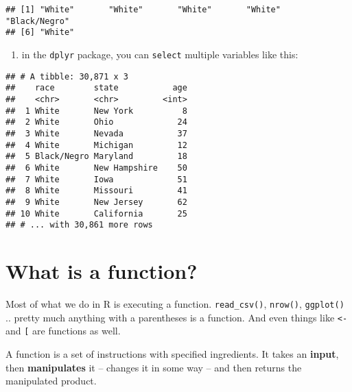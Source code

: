 \documentclass[]{book}
\newenvironment{Shaded}{\begin{snugshade}}{\end{snugshade}}
\newcommand{\KeywordTok}[1]{\textcolor[rgb]{0.13,0.29,0.53}{\textbf{#1}}}
\newcommand{\StringTok}[1]{\textcolor[rgb]{0.31,0.60,0.02}{#1}}
\newcommand{\OperatorTok}[1]{\textcolor[rgb]{0.81,0.36,0.00}{\textbf{#1}}}
\newcommand{\NormalTok}[1]{#1}
\providecommand{\tightlist}{%
  \setlength{\itemsep}{0pt}\setlength{\parskip}{0pt}}
\theoremstyle{definition}
\theoremstyle{definition}
\theoremstyle{definition}
\theoremstyle{remark}
\begin{document}
\begin{Shaded}
\end{Shaded}

\begin{verbatim}
## [1] "White"       "White"       "White"       "White"       "Black/Negro"
## [6] "White"
\end{verbatim}

\begin{enumerate}
\def\labelenumi{\arabic{enumi}.}
\setcounter{enumi}{4}
\tightlist
\item
  in the \texttt{dplyr} package, you can \texttt{select} multiple
  variables like this:
\end{enumerate}

\begin{Shaded}
\end{Shaded}

\begin{verbatim}
## # A tibble: 30,871 x 3
##    race        state           age
##    <chr>       <chr>         <int>
##  1 White       New York          8
##  2 White       Ohio             24
##  3 White       Nevada           37
##  4 White       Michigan         12
##  5 Black/Negro Maryland         18
##  6 White       New Hampshire    50
##  7 White       Iowa             51
##  8 White       Missouri         41
##  9 White       New Jersey       62
## 10 White       California       25
## # ... with 30,861 more rows
\end{verbatim}

\section{What is a function?}\label{what-is-a-function}

Most of what we do in R is executing a function. \texttt{read\_csv()},
\texttt{nrow()}, \texttt{ggplot()} .. pretty much anything with a
parentheses is a function. And even things like \texttt{\textless{}-}
and \texttt{{[}} are functions as well.

A function is a set of instructions with specified ingredients. It takes
an \textbf{input}, then \textbf{manipulates} it -- changes it in some
way -- and then returns the manipulated product.
\end{document}
